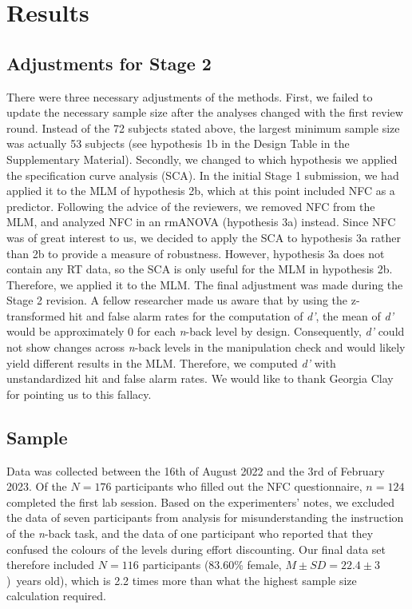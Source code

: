 \documentclass[
  man,floatsintext]{apa6}
\begin{document}
\hypertarget{results}{%
\section{Results}\label{results}}

\hypertarget{adjustments-for-stage-2}{%
\subsection{Adjustments for Stage 2}\label{adjustments-for-stage-2}}

There were three necessary adjustments of the methods.
First, we failed to update the necessary sample size after the analyses changed with the first review round.
Instead of the 72 subjects stated above, the largest minimum sample size was actually 53 subjects (see hypothesis 1b in the Design Table in the Supplementary Material).
Secondly, we changed to which hypothesis we applied the specification curve analysis (SCA).
In the initial Stage 1 submission, we had applied it to the MLM of hypothesis 2b, which at this point included NFC as a predictor.
Following the advice of the reviewers, we removed NFC from the MLM, and analyzed NFC in an rmANOVA (hypothesis 3a) instead.
Since NFC was of great interest to us, we decided to apply the SCA to hypothesis 3a rather than 2b to provide a measure of robustness.
However, hypothesis 3a does not contain any RT data, so the SCA is only useful for the MLM in hypothesis 2b.
Therefore, we applied it to the MLM.
The final adjustment was made during the Stage 2 revision.
A fellow researcher made us aware that by using the z-transformed hit and false alarm rates for the computation of \emph{d'}, the mean of \emph{d'} would be approximately 0 for each \emph{n}-back level by design.
Consequently, \emph{d'} could not show changes across \emph{n}-back levels in the manipulation check and would likely yield different results in the MLM.
Therefore, we computed \emph{d'} with unstandardized hit and false alarm rates.
We would like to thank Georgia Clay for pointing us to this fallacy.

\hypertarget{sample}{%
\subsection{Sample}\label{sample}}

Data was collected between the 16th of August 2022 and the 3rd of February 2023.
Of the \(N=176\) participants who filled out the NFC questionnaire, \(n=124\) completed the first lab session.
Based on the experimenters' notes, we excluded the data of seven participants from analysis for misunderstanding the instruction of the \emph{n}-back task, and the data of one participant who reported that they confused the colours of the levels during effort discounting.
Our final data set therefore included \(N=116\) participants (83.60\% female, \(M \pm SD=22.4 \pm 3\))~years old), which is 2.2 times more than what the highest sample size calculation required.
\end{document}
